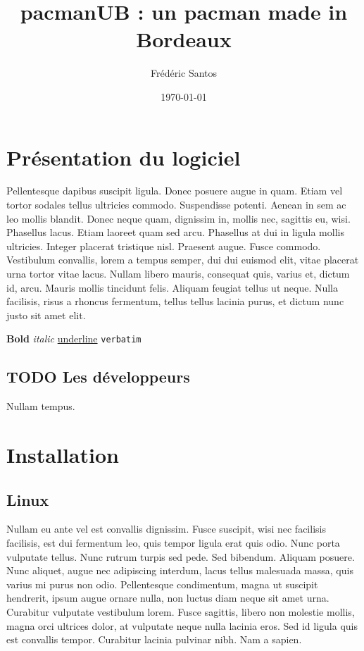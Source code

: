 \documentclass[11pt]{article}
\author{Frédéric Santos}
\date{\today}
\title{pacmanUB : un pacman made in Bordeaux}
\begin{document}
\maketitle
\tableofcontents


\section{Présentation du logiciel}
\label{sec:orgdec5e37}
Pellentesque dapibus suscipit ligula.  Donec posuere augue in quam.  Etiam vel tortor sodales tellus ultricies commodo.  Suspendisse potenti.  Aenean in sem ac leo mollis blandit.  Donec neque quam, dignissim in, mollis nec, sagittis eu, wisi.  Phasellus lacus.  Etiam laoreet quam sed arcu.  Phasellus at dui in ligula mollis ultricies.  Integer placerat tristique nisl.  Praesent augue.  Fusce commodo.  Vestibulum convallis, lorem a tempus semper, dui dui euismod elit, vitae placerat urna tortor vitae lacus.  Nullam libero mauris, consequat quis, varius et, dictum id, arcu.  Mauris mollis tincidunt felis.  Aliquam feugiat tellus ut neque.  Nulla facilisis, risus a rhoncus fermentum, tellus tellus lacinia purus, et dictum nunc justo sit amet elit.

\textbf{Bold}
\emph{italic}
\uline{underline}
\texttt{verbatim}

\subsection{{\bfseries\sffamily TODO} Les développeurs}
\label{sec:orgb9c7125}
\label{sec-dev}
Nullam tempus.  

\section{Installation}
\label{sec:org608310b}
\subsection{Linux}
\label{sec:org170acce}
Nullam eu ante vel est convallis dignissim.  Fusce suscipit, wisi nec facilisis facilisis, est dui fermentum leo, quis tempor ligula erat quis odio.  Nunc porta vulputate tellus.  Nunc rutrum turpis sed pede.  Sed bibendum.  Aliquam posuere.  Nunc aliquet, augue nec adipiscing interdum, lacus tellus malesuada massa, quis varius mi purus non odio.  Pellentesque condimentum, magna ut suscipit hendrerit, ipsum augue ornare nulla, non luctus diam neque sit amet urna.  Curabitur vulputate vestibulum lorem.  Fusce sagittis, libero non molestie mollis, magna orci ultrices dolor, at vulputate neque nulla lacinia eros.  Sed id ligula quis est convallis tempor.  Curabitur lacinia pulvinar nibh.  Nam a sapien.
\end{document}
